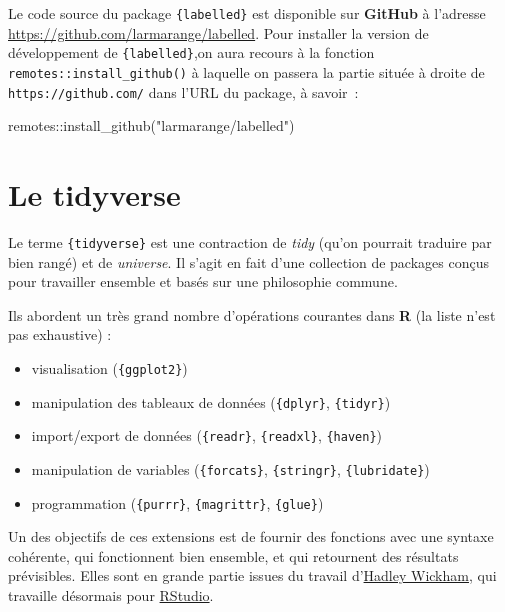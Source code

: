 \documentclass[
  letterpaper,
  DIV=11,
  numbers=noendperiod,
  oneside]{scrreprt}
\newenvironment{Shaded}{\begin{snugshade}}{\end{snugshade}}
\newcommand{\FunctionTok}[1]{\textcolor[rgb]{0.28,0.35,0.67}{#1}}
\newcommand{\NormalTok}[1]{\textcolor[rgb]{0.00,0.23,0.31}{#1}}
\newcommand{\SpecialCharTok}[1]{\textcolor[rgb]{0.37,0.37,0.37}{#1}}
\newcommand{\StringTok}[1]{\textcolor[rgb]{0.13,0.47,0.30}{#1}}
\providecommand{\tightlist}{%
  \setlength{\itemsep}{0pt}\setlength{\parskip}{0pt}}\usepackage{longtable,booktabs,array}
\begin{document}
Le code source du package \texttt{\{labelled\}} est disponible sur
\textbf{GitHub} à l'adresse
\url{https://github.com/larmarange/labelled}. Pour installer la version
de développement de \texttt{\{labelled\}},on aura recours à la fonction
\texttt{remotes::install\_github()} à laquelle on passera la partie
située à droite de \texttt{https://github.com/} dans l'URL du package, à
savoir~:

\begin{Shaded}
\begin{Highlighting}[]
\NormalTok{remotes}\SpecialCharTok{::}\FunctionTok{install\_github}\NormalTok{(}\StringTok{"larmarange/labelled"}\NormalTok{)}
\end{Highlighting}
\end{Shaded}

\hypertarget{le-tidyverse}{%
\section{Le tidyverse}\label{le-tidyverse}}

Le terme \texttt{\{tidyverse\}} est une contraction de \emph{tidy}
(qu'on pourrait traduire par bien rangé) et de \emph{universe}. Il
s'agit en fait d'une collection de packages conçus pour travailler
ensemble et basés sur une philosophie commune.

Ils abordent un très grand nombre d'opérations courantes dans \textbf{R}
(la liste n'est pas exhaustive) :

\begin{itemize}
\tightlist
\item
  visualisation (\texttt{\{ggplot2\}})
\item
  manipulation des tableaux de données (\texttt{\{dplyr\}},
  \texttt{\{tidyr\}})
\item
  import/export de données (\texttt{\{readr\}}, \texttt{\{readxl\}},
  \texttt{\{haven\}})
\item
  manipulation de variables (\texttt{\{forcats\}}, \texttt{\{stringr\}},
  \texttt{\{lubridate\}})
\item
  programmation (\texttt{\{purrr\}}, \texttt{\{magrittr\}},
  \texttt{\{glue\}})
\end{itemize}

Un des objectifs de ces extensions est de fournir des fonctions avec une
syntaxe cohérente, qui fonctionnent bien ensemble, et qui retournent des
résultats prévisibles. Elles sont en grande partie issues du travail
d'\href{http://hadley.nz/}{Hadley Wickham}, qui travaille désormais pour
\href{https://www.rstudio.com}{RStudio}.
\end{document}

